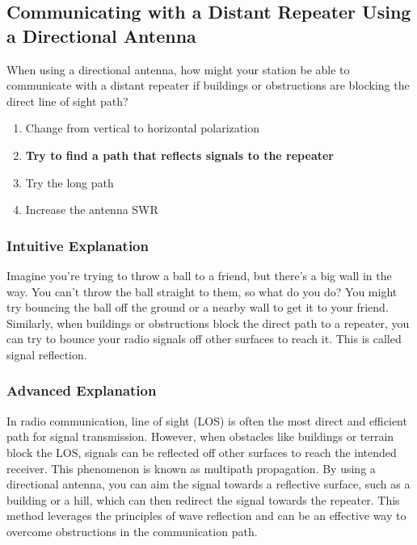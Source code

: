 \subsection{Communicating with a Distant Repeater Using a Directional Antenna}
\label{T3A05}

\begin{tcolorbox}[colback=gray!10!white,colframe=black!75!black,title=T3A05]
When using a directional antenna, how might your station be able to communicate with a distant repeater if buildings or obstructions are blocking the direct line of sight path?
\begin{enumerate}[noitemsep]
    \item Change from vertical to horizontal polarization
    \item \textbf{Try to find a path that reflects signals to the repeater}
    \item Try the long path
    \item Increase the antenna SWR
\end{enumerate}
\end{tcolorbox}

\subsubsection{Intuitive Explanation}
Imagine you're trying to throw a ball to a friend, but there's a big wall in the way. You can't throw the ball straight to them, so what do you do? You might try bouncing the ball off the ground or a nearby wall to get it to your friend. Similarly, when buildings or obstructions block the direct path to a repeater, you can try to bounce your radio signals off other surfaces to reach it. This is called signal reflection.

\subsubsection{Advanced Explanation}
In radio communication, line of sight (LOS) is often the most direct and efficient path for signal transmission. However, when obstacles like buildings or terrain block the LOS, signals can be reflected off other surfaces to reach the intended receiver. This phenomenon is known as multipath propagation. By using a directional antenna, you can aim the signal towards a reflective surface, such as a building or a hill, which can then redirect the signal towards the repeater. This method leverages the principles of wave reflection and can be an effective way to overcome obstructions in the communication path.